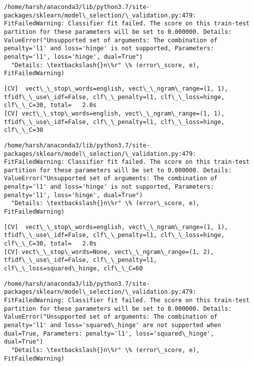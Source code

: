 \documentclass[11pt]{article}
\begin{document}
    \begin{Verbatim}[commandchars=\\\{\}]
/home/harsh/anaconda3/lib/python3.7/site-packages/sklearn/model\_selection/\_validation.py:479: FitFailedWarning: Classifier fit failed. The score on this train-test partition for these parameters will be set to 0.000000. Details: 
ValueError("Unsupported set of arguments: The combination of penalty='l1' and loss='hinge' is not supported, Parameters: penalty='l1', loss='hinge', dual=True")
  "Details: \textbackslash{}n\%r" \% (error\_score, e), FitFailedWarning)

    \end{Verbatim}

    \begin{Verbatim}[commandchars=\\\{\}]
[CV]  vect\_\_stop\_words=english, vect\_\_ngram\_range=(1, 1), tfidf\_\_use\_idf=False, clf\_\_penalty=l1, clf\_\_loss=hinge, clf\_\_C=30, total=   2.0s
[CV] vect\_\_stop\_words=english, vect\_\_ngram\_range=(1, 1), tfidf\_\_use\_idf=False, clf\_\_penalty=l1, clf\_\_loss=hinge, clf\_\_C=30 

    \end{Verbatim}

    \begin{Verbatim}[commandchars=\\\{\}]
/home/harsh/anaconda3/lib/python3.7/site-packages/sklearn/model\_selection/\_validation.py:479: FitFailedWarning: Classifier fit failed. The score on this train-test partition for these parameters will be set to 0.000000. Details: 
ValueError("Unsupported set of arguments: The combination of penalty='l1' and loss='hinge' is not supported, Parameters: penalty='l1', loss='hinge', dual=True")
  "Details: \textbackslash{}n\%r" \% (error\_score, e), FitFailedWarning)

    \end{Verbatim}

    \begin{Verbatim}[commandchars=\\\{\}]
[CV]  vect\_\_stop\_words=english, vect\_\_ngram\_range=(1, 1), tfidf\_\_use\_idf=False, clf\_\_penalty=l1, clf\_\_loss=hinge, clf\_\_C=30, total=   2.0s
[CV] vect\_\_stop\_words=None, vect\_\_ngram\_range=(1, 2), tfidf\_\_use\_idf=False, clf\_\_penalty=l1, clf\_\_loss=squared\_hinge, clf\_\_C=60 

    \end{Verbatim}

    \begin{Verbatim}[commandchars=\\\{\}]
/home/harsh/anaconda3/lib/python3.7/site-packages/sklearn/model\_selection/\_validation.py:479: FitFailedWarning: Classifier fit failed. The score on this train-test partition for these parameters will be set to 0.000000. Details: 
ValueError("Unsupported set of arguments: The combination of penalty='l1' and loss='squared\_hinge' are not supported when dual=True, Parameters: penalty='l1', loss='squared\_hinge', dual=True")
  "Details: \textbackslash{}n\%r" \% (error\_score, e), FitFailedWarning)

    \end{Verbatim}
\end{document}

